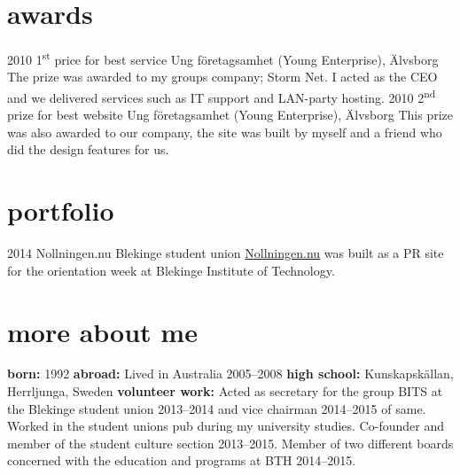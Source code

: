 \documentclass[]{friggeri-cv} %
\begin{document}
\section{awards}

\begin{entrylist}
\entry
{2010}
{1\textsuperscript{st} price for best service}
{Ung företagsamhet (Young Enterprise), Älvsborg}
{The prize was awarded to my groups company; Storm Net. I acted as the CEO and we delivered services such as IT support and LAN-party hosting.}
\entry
{2010}
{2\textsuperscript{nd} prize for best website}
{Ung företagsamhet (Young Enterprise), Älvsborg}
{This prize was also awarded to our company, the site was built by myself and a friend who did the design features for us.}
\end{entrylist}

\section{portfolio}

\begin{entrylist}
\entry
{2014}
{Nollningen.nu}
{Blekinge student union}
{\href{http://www.nollningen.nu}{Nollningen.nu} was built as a PR site for the orientation week at Blekinge Institute of Technology.}
\end{entrylist}


\section{more about me}
\textbf{born:} 1992 \textbf{abroad:} Lived in Australia 2005--2008 \textbf{high school:} Kunskapskällan, Herrljunga, Sweden \textbf{volunteer work:} Acted as secretary for the group BITS at the Blekinge student union 2013--2014 and vice chairman 2014--2015 of same. Worked in the student unions pub during my university studies. Co-founder and member of the student culture section 2013--2015. Member of two different boards concerned with the education and programs at BTH 2014--2015.
\end{document}
